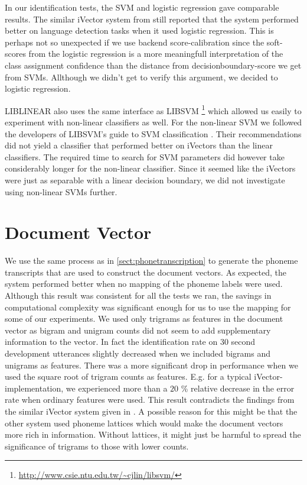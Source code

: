 In our identification tests, the SVM and logistic regression gave comparable results. The similar iVector system from \cite{lrivector} still reported that the system performed better on language detection tasks when it used logistic regression. This is perhaps not so unexpected if we use backend score-calibration since the soft-scores from the logistic regression is a more meaningfull interpretation of the class assignment confidence than the distance from decisionboundary-score we get from SVMs. Allthough we didn't get to verify this argument, we decided to logistic regression.

LIBLINEAR also uses the same interface as LIBSVM \footnote{\url{http://www.csie.ntu.edu.tw/~cjlin/libsvm/}} which allowed us easily to experiment with non-linear classifiers as well. For the non-linear SVM we followed the developers of LIBSVM's guide to SVM classification \cite{practicalsvm}. Their recommendations did not yield a classifier that performed better on iVectors than the linear classifiers. The required time to search for SVM parameters did however take considerably longer for the non-linear classifier. Since it seemed like the iVectors were just as separable with a linear decision boundary, we did not investigate using non-linear SVMs further. 

\section{Document Vector}

We use the same process as in \ref{sect:phonetranscription} to generate the phoneme transcripts that are used to construct the document vectors. As expected, the system performed better when no mapping of the phoneme labels were used. Although this result was consistent for all the tests we ran, the savings in computational complexity was significant enough for us to use the mapping for some of our experiments. We used only trigrams as features in the document vector as bigram and unigram counts did not seem to add supplementary information to the vector. In fact the identification rate on 30 second development utterances slightly decreased when we included bigrams and unigrams as features. There was a more significant drop in performance when we used the square root of trigram counts as features. E.g. for a typical iVector-implementation, we experienced more than a $20$ \% relative decrease in the error rate when ordinary features were used. This result contradicts the findings from the similar iVector system given in \cite{lrivector}. A possible reason for this might be that the other system used phoneme lattices which would make the document vectors more rich in information. Without lattices, it might just be harmful to spread the significance of trigrams to those with lower counts.

